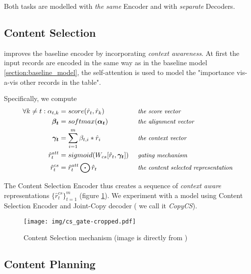 Both tasks are modelled with \emph{the same} Encoder and with \emph{separate} Decoders.

\subsection{Content Selection} \label{subsection:content_selection}

\citep{puduppully2019datatotext} improves the baseline encoder by incorporating \emph{context awareness}. At first the input records are encoded in the same way as in the baseline model \ref{section:baseline_model}, the self-attention is used to model the "importance vis-a-vis other records in the table".

Specifically, we compute
\begin{align*}
\forall k \neq t : \alpha_{t, k} &= score(\hat{r}_t, \hat{r}_k)                         &&\mbox{ \small \emph{the score vector}}\\
\boldsymbol{\beta_t}             &= softmax(\boldsymbol{\alpha_t})                      &&\mbox{ \small \emph{the alignment vector}}\\
\boldsymbol{\gamma_t}            &= \sum_{i=1}^m{\beta_{t, i} * \hat{r}_i}               &&\mbox{ \small \emph{the context vector}}\\
\hat{r}_t^{att}                  &= sigmoid( W_{cs} [\hat{r}_t, \boldsymbol{\gamma_t}] ) &&\mbox{ \small \emph{gating mechanism}}\\
\hat{r}_t^{cs}                   &= \hat{r}_t^{att} \bigodot \hat{r}_t                  &&\mbox{ \small \emph{the content selected representation}}
\end{align*}

The Content Selection Encoder thus creates a sequence of \emph{context aware} representations $\{\hat{r}_t^{cs}\}_{t=1}^m$ (figure \ref{figure:content_selection_pudupully}). We experiment with a model using Content Selection Encoder and Joint-Copy decoder ( we call it \emph{CopyCS}).

\begin{figure}[!h]
    \texttt{[image: img/cs\_gate-cropped.pdf]}
    \caption{Content Selection mechanism (image is directly from \citep{puduppully2019datatotext})} \label{figure:content_selection_pudupully}
\end{figure}

\subsection{Content Planning} \label{subsection:content_planning}

